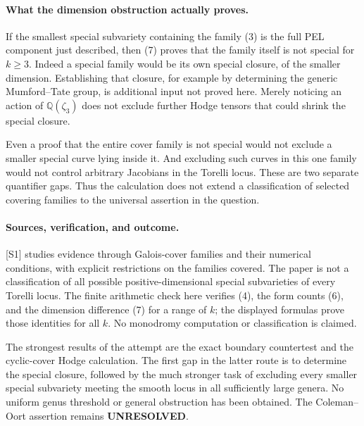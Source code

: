 \documentclass[11pt]{article}
\begin{document}
\paragraph{What the dimension obstruction actually proves.}
If the smallest special subvariety containing the family (3) is the
full PEL component just described, then (7) proves that the family
itself is not special for $k\ge3$. Indeed a special family would be
its own special closure, of the smaller dimension. Establishing that
closure, for example by determining the generic Mumford--Tate group,
is additional input not proved here. Merely noticing an action of
$\mathbb Q(\zeta_3)$ does not exclude further Hodge tensors that
could shrink the special closure.

Even a proof that the entire cover family is not special would not
exclude a smaller special curve lying inside it. And excluding such
curves in this one family would not control arbitrary Jacobians in
the Torelli locus. These are two separate quantifier gaps. Thus the
calculation does not extend a classification of selected covering
families to the universal assertion in the question.

\paragraph{Sources, verification, and outcome.}
[S1] studies evidence through Galois-cover families and their numerical
conditions, with explicit restrictions on the families covered. The
paper is not a classification of all possible positive-dimensional
special subvarieties of every Torelli locus. The finite arithmetic
check here verifies (4), the form counts (6), and the dimension
difference (7) for a range of $k$; the displayed formulas prove those
identities for all $k$. No monodromy computation or classification is
claimed.

The strongest results of the attempt are the exact boundary
countertest and the cyclic-cover Hodge calculation. The first gap in
the latter route is to determine the special closure, followed by the
much stronger task of excluding every smaller special subvariety
meeting the smooth locus in all sufficiently large genera. No
uniform genus threshold or general obstruction has been obtained.
The Coleman--Oort assertion remains \textbf{UNRESOLVED}.
\end{document}
